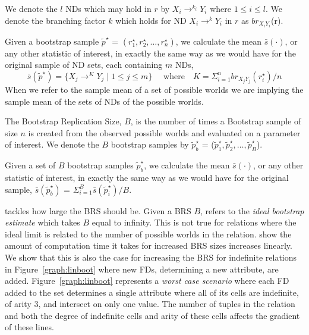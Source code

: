 We denote the $l$ NDs which may hold in
$r$ by $X_i \to^{k_i} Y_i$ where $1 \le i \le l$.
We denote the branching factor $k$ which holds for ND $X_i \to^k Y_i$ in
$r$ as $br_{X_iY_i}$(r).  

\begin{definition}
\begin{rm}
Given a bootstrap sample {\bf $\tilde{p}^\star$} = \linebreak[4] $(r_1^\star, r_2^\star, \ldots, r_n^\star )$, we calculate the
mean $\bar{s}(\cdot)$, or any other statistic of interest, in exactly the same
way as we would have for the original sample of ND sets, each containing $m$ NDs, 
\[\bar{s}(\tilde{p}^\star) = \{ X_j \to^K Y_j \mid 1 \le j \le m \}\quad\mbox{ where}\quad K = {\Sigma_{i = 1}^n br_{X_jY_j}(r_i^\star)/n}\]
When we refer to the sample mean of a set of possible worlds we are implying
the sample mean of the sets of NDs of the possible worlds.
\end{rm}
\end{definition}



\begin{definition}
\begin{rm}
The Bootstrap Replication Size, $B$, is the number of times a Bootstrap
sample of size $n$ is created from the observed possible worlds and evaluated on a parameter of interest. We denote the $B$ bootstrap samples by $\tilde{p}^\star_b$ = ({\bf $\tilde{p}^\star_1, \tilde{p}^\star_2, \ldots, \tilde{p}^\star_B$}).
\end{rm}
\end{definition}


\begin{definition}
\begin{rm}
Given a set of $B$ bootstrap samples $\tilde{p}^\star_b$,  
we calculate the mean $\bar{s}(\cdot)$, or any other statistic of 
interest, in exactly the same
way as we would have for the original sample, 
$\bar{s}(\tilde{p}^\star_b)$  = $\Sigma_{i = 1}^B \bar{s}(\tilde{p}^\star_i) / B$.
\end{rm}
\end{definition}


\cite{et93} tackles how large the BRS should be. Given a BRS $B$, \cite{et93}
refers to the {\em ideal bootstrap estimate} which takes $B$ equal to
infinity. 
This is not true for relations where the ideal limit is related to the
number of possible worlds in the relation.
\cite{et93} show the amount of computation time it takes for increased
BRS sizes increases linearly. We show that this is also the case for 
increasing the BRS for indefinite relations in Figure~\ref{graph:linboot}
where new FDs, determining a new attribute, are added.
Figure~\ref{graph:linboot} represents a {\em worst case scenario} where each FD added to the
set determines a single attribute where all of its cells are indefinite, of
arity 3, and intersect on only one value. The number of tuples in the
relation and both the degree of indefinite cells and arity of these
cells affects the gradient of these lines.


